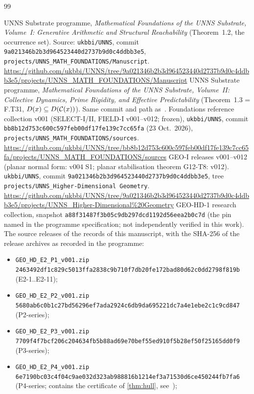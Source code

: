 \clearpage
{}
\begin{thebibliography}{99}\small\raggedright
{} UNNS Substrate programme, \emph{Mathematical Foundations of the UNNS Substrate, Volume~I: Generative Arithmetic and Structural Reachability} (Theorem~1.2, the occurrence set). Source: \texttt{ukbbi/UNNS}, commit \texttt{9a021346b2b3d964523440d2737b9d0c4ddbb3e5}, \texttt{projects/UNNS\_MATH\_FOUNDATIONS/Manuscript}. \url{https://github.com/ukbbi/UNNS/tree/9a021346b2b3d964523440d2737b9d0c4ddbb3e5/projects/UNNS_MATH_FOUNDATIONS/Manuscript}
 UNNS Substrate programme, \emph{Mathematical Foundations of the UNNS Substrate, Volume~II: Collective Dynamics, Prime Rigidity, and Effective Predictability} (Theorem~1.3 = F.T31, $D(x)\subseteq D(\mathcal C(x))$). Same commit and path as~\cite{FoundI}.
 Foundations reference collection v001 (SELECT-I/II, FIELD-I v001--v012; frozen), \texttt{ukbbi/UNNS}, commit \texttt{bb8b12d753c600c597feb00df17fe139c7cc65fa} (23 Oct.\ 2026), \texttt{projects/UNNS\_MATH\_FOUNDATIONS/sources}. \url{https://github.com/ukbbi/UNNS/tree/bb8b12d753c600c597feb00df17fe139c7cc65fa/projects/UNNS_MATH_FOUNDATIONS/sources}
 GEO-I releases v001--v012 (planar normal form: v004 S1; planar stabilisation theorem G12-T8: v012). \texttt{ukbbi/UNNS}, commit \texttt{9a021346b2b3d964523440d2737b9d0c4ddbb3e5}, tree \texttt{projects/UNNS\_Higher-Dimensional Geometry}. \url{https://github.com/ukbbi/UNNS/tree/9a021346b2b3d964523440d2737b9d0c4ddbb3e5/projects/UNNS_Higher-Dimensional%20Geometry}
 GEO-HD-1 research collection, snapshot \texttt{a88f31487f3b05c9db297dcd1192d56eea2b0c7d} (the pin named in the programme specification; not independently verified in this work). The source releases of the records of this manuscript, with the SHA-256 of the release archives as recorded in the programme: 
\begin{itemize}[leftmargin=1.4em,itemsep=1pt,topsep=2pt]\footnotesize
\item\label{bib:P1}\texttt{GEO\_HD\_E2\_P1\_v001.zip} \texttt{2463492df1c829c5013ffa2838c9b710f7db20fe172bad80d62c0dd2798f819b} (E2-1..E2-11);
\item\texttt{GEO\_HD\_E2\_P2\_v001.zip} \texttt{5680ab6c0b1c27bd56296ef7ada2924c6db9da695221dc7a4e1ebe2c1c9cd847} (P2-series);
\item\texttt{GEO\_HD\_E2\_P3\_v001.zip} \texttt{7709f4f7bcf206c204634fb5b88ad69e70bef55ed910f5b28ef50f25165dd0f9} (P3-series);
\item\texttt{GEO\_HD\_E2\_P4\_v001.zip} \texttt{6e7190bc03c4f04c9ae032d323ab988816b1214ef3a71530d6ce450244fb7fa6} (P4-series; contains the certificate of \cref{thm:hull}, see~\cite{HD1P4});

\end{itemize}
\end{thebibliography}
